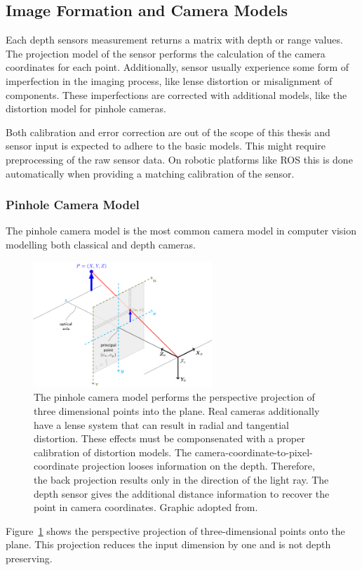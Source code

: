 \subsection{Image Formation and Camera Models}

Each depth sensors measurement returns a matrix with depth or range values.
The projection model of the sensor performs the calculation of the camera coordinates for each point.
Additionally, sensor usually experience some form of imperfection in the imaging process, like lense distortion or misalignment of components.
These imperfections are corrected with additional models, like the distortion model for pinhole cameras.

Both calibration and error correction are out of the scope of this thesis and sensor input is expected to adhere to the basic models.
This might require preprocessing of the raw sensor data.
On robotic platforms like \acrlong{ROS} this is done automatically when providing a matching calibration of the sensor.

\subsubsection{Pinhole Camera Model}

The pinhole camera model is the most common camera model in computer vision modelling both classical and depth cameras.

\begin{figure}[H]
    \includegraphics[width=0.6\textwidth]{chapter03/img/pinhole_camera_model.png}
    \caption[Pinhole Camera Model]{The pinhole camera model performs the perspective projection of three dimensional points into the plane. Real cameras additionally have a lense system that can result in radial and tangential distortion. These effects must be componsenated with a proper calibration of distortion models. The camera-coordinate-to-pixel-coordinate projection looses information on the depth. Therefore, the back projection results only in the direction of the light ray. The depth sensor gives the additional distance information to recover the point in camera coordinates. Graphic adopted from\cite{opencv_pinhole}.}\label{fig:pinhole_model}
\end{figure}
Figure~\ref{fig:pinhole_model} shows the perspective projection of three-dimensional points onto the plane.
This projection reduces the input dimension by one and is not depth preserving.

